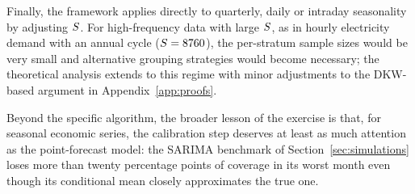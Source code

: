 Finally, the framework applies directly to quarterly, daily or
intraday seasonality by adjusting $S$.  For high-frequency data
with large $S$, as in hourly electricity demand with an annual
cycle ($S = 8760$), the per-stratum sample sizes would be very
small and alternative grouping strategies would become necessary; the
theoretical analysis extends to this regime with minor adjustments to
the DKW-based argument in Appendix~\ref{app:proofs}.

Beyond the specific algorithm, the broader lesson of the exercise is
that, for seasonal economic series, the calibration step deserves at
least as much attention as the point-forecast model: the
SARIMA benchmark of Section~\ref{sec:simulations} loses more than
twenty percentage points of coverage in its worst month even though
its conditional mean closely approximates the true one.
